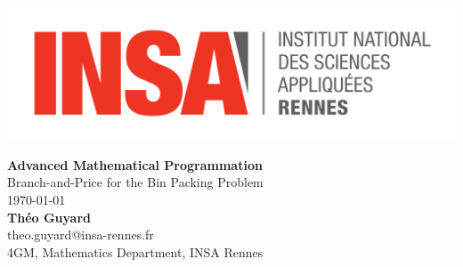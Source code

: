 \begin{titlepage}
	\includegraphics[scale=0.1]{img/logo-insa.png}
	\vspace{1cm}
	\begin{center}
		{\Huge \textbf{Advanced Mathematical Programmation}}
		\vspace{0.1cm} \\
		{\Large Branch-and-Price for the Bin Packing Problem}
		\vspace{0.5cm} \\
		\today
		\vspace{0.5cm} \\
		\textbf{Théo Guyard}
		\vspace{0.1cm} \\
		theo.guyard@insa-rennes.fr
		\vspace{0.1cm} \\
		4GM, Mathematics Department, INSA Rennes
		\vspace{0.5cm} \\
	\end{center}

	\vspace{1cm}

	\tableofcontents
	
\end{titlepage}